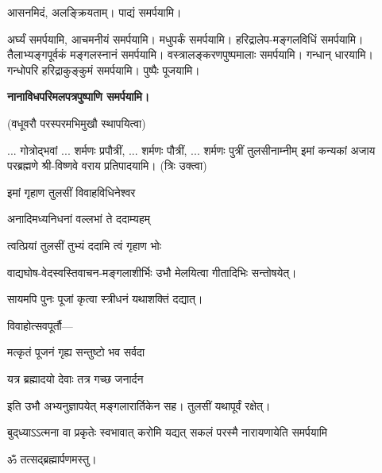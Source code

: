 आसनमिदं, अलङ्क्रियताम्।
पाद्यं समर्पयामि।

अर्घ्यं समर्पयामि, आचमनीयं समर्पयामि।
मधुपर्कं समर्पयामि।
हरिद्रालेप-मङ्गलविधिं समर्पयामि।
तैलाभ्यङ्गपूर्वकं मङ्गलस्नानं समर्पयामि।
वस्त्रालङ्करणपुष्पमालाः समर्पयामि।
गन्धान् धारयामि। गन्धोपरि हरिद्राकुङ्कुमं समर्पयामि।
पुष्पैः पूजयामि।

\textbf{\devAya{} नानाविधपरिमलपत्रपुष्पाणि समर्पयामि।}

(वधूवरौ परस्परमभिमुखौ स्थापयित्वा)

... गोत्रोद्भवां ... शर्मणः प्रपौत्रीं, ... शर्मणः पौत्रीं, ... शर्मणः पुत्रीं
तुलसीनाम्नीम् इमां कन्यकां अजाय
परब्रह्मणे श्री-विष्णवे वराय प्रतिपादयामि। (त्रिः उक्त्वा)

{इमां गृहाण तुलसीं विवाहविधिनेश्वर}

{अनादिमध्यनिधनां वल्लभां ते ददाम्यहम्}

{त्वत्प्रियां तुलसीं तुभ्यं ददामि त्वं गृहाण भोः}

वाद्यघोष-वेदस्वस्तिवाचन-मङ्गलाशीर्भिः उभौ मेलयित्वा गीतादिभिः सन्तोषयेत्।

सायमपि पुनः पूजां कृत्वा स्त्रीधनं यथाशक्तिं दद्यात्।

विवाहोत्सवपूर्तौ\textsf{—}\hfill\mbox{}

{मत्कृतं पूजनं गृह्य सन्तुष्टो भव सर्वदा}

{यत्र ब्रह्मादयो देवाः तत्र गच्छ जनार्दन}

इति उभौ अभ्यनुज्ञापयेत् मङ्गलारार्तिकेन सह। तुलसीं यथापूर्वं रक्षेत्।

{बुद्‌ध्याऽऽत्मना वा प्रकृतेः स्वभावात्}
{करोमि यद्यत् सकलं परस्मै}
{नारायणायेति समर्पयामि}

ॐ तत्सद्ब्रह्मार्पणमस्तु।

\closesub
\begin{center}
\end{center}

\closesection